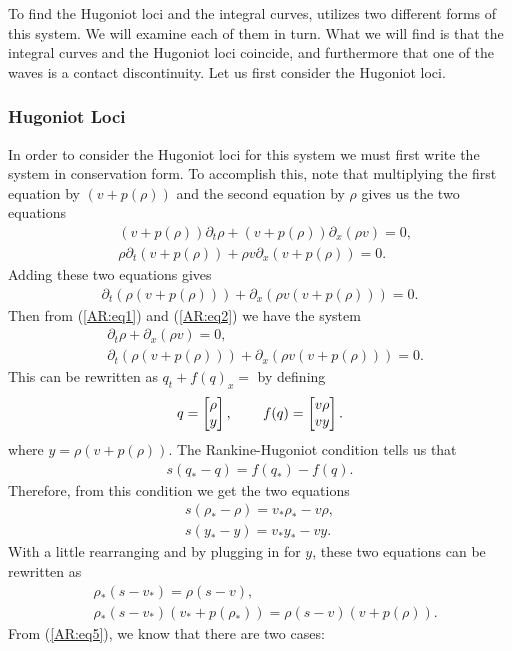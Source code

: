 \documentclass{article}
\begin{document}
To find the Hugoniot loci and the integral curves, \cite{AwRascle2000} utilizes two different forms of this system. 
We will examine each of them in turn. What we will find is that the integral curves and the Hugoniot loci coincide, 
and furthermore that one of the waves is a contact discontinuity. Let us first consider the Hugoniot loci. 

\subsubsection{Hugoniot Loci}
In order to consider the Hugoniot loci for this system we must first write the system in conservation form. 
To accomplish this, note that multiplying the first equation by $(v + p(\rho ))$ and the second equation 
by $\rho$ gives us the two equations 
\begin{align*}
&(v + p(\rho ))\partial_t\rho + (v + p(\rho ))\partial_x(\rho v) = 0,  \\
&\rho\partial_t \left(v + p(\rho )\right) + \rho v\partial_x \left( v + p(\rho )\right) = 0.
\end{align*}
Adding these two equations gives
\begin{align}\label{AR:eq2}
\partial_t \left(\rho\left(v + p(\rho )\right)\right) + \partial_x \left( \rho v\left(v + p(\rho )\right)\right) = 0.
\end{align}
Then from (\ref{AR:eq1}) and (\ref{AR:eq2}) we have the system 
\begin{align*}
&\partial_t\rho + \partial_x(\rho v) = 0, \\
&\partial_t \left(\rho\left(v + p(\rho )\right)\right) + \partial_x \left( \rho v\left(v + p(\rho )\right)\right) = 0.
\end{align*}
This can be rewritten as $q_t + f(q)_x = $ by defining
\begin{align*}
q = \left[ \begin{matrix}
\rho \\ y
\end{matrix}\right], \hspace{0.3in}
f(q) = \left[ \begin{matrix}
v\rho \\
vy
\end{matrix}\right].
\end{align*}
where $y = \rho\left(v + p(\rho )\right)$.
The Rankine-Hugoniot condition tells us that 
\begin{align*}
s(q_*- q) = f(q_*) - f(q).
\end{align*}
Therefore, from this condition we get the two equations
\begin{align}
s(\rho_* - \rho) = v_*\rho_* - v\rho, \label{AR:eq3}\\
s(y_* - y) = v_*y_* - vy.\label{AR:eq4}
\end{align}
With a little rearranging and by plugging in for $y$, these two equations can be rewritten as
\begin{align}
&\rho_*(s - v_*) = \rho (s - v), \label{AR:eq5}\\
&\rho_*(s - v_*)\left(v_* + p(\rho_* )\right) = \rho(s - v)\left(v + p(\rho )\right).\label{AR:eq6}
\end{align}
From (\ref{AR:eq5}), we know that there are two cases: 
\end{document}
